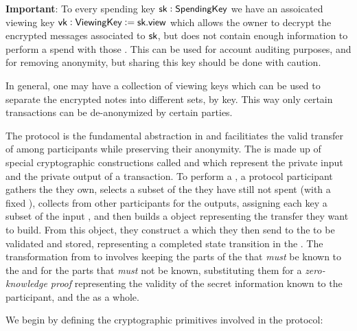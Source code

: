 \textbf{Important}: To every spending key ${\textsf{sk}} : {\textsf{SpendingKey}}$ we have an assoicated viewing key ${\textsf{vk}} : {\textsf{ViewingKey}} := {\textsf{sk}}.{\textsf{view}}$ which allows the owner to decrypt the encrypted messages associated to ${\textsf{sk}}$, but does not contain enough information to perform a spend with those . This can be used for account auditing purposes, and for removing anonymity, but sharing this key should be done with caution.

In general, one may have a collection of viewing keys which can be used to separate the encrypted notes into different sets, by key. This way only certain transactions can be de-anonymized by certain parties.


The \Transfer{} protocol is the fundamental abstraction in \MantaPay{} and facilitiates the valid transfer of  among participants while preserving their anonymity. The \Transfer{} is made up of special cryptographic constructions called  and  which represent the private input and the private output of a transaction. To perform a \Transfer{}, a protocol participant gathers the  they own, selects a subset of the  they have still not spent (with a fixed \AssetId{}), collects  from other participants for the outputs, assigning each key a subset of the input , and then builds a \Transfer{} object representing the transfer they want to build. From this \Transfer{} object, they construct a \TransferPost{} which they then send to the \Ledger{} to be validated and stored, representing a completed state transition in the \Ledger{}. The transformation from \Transfer{} to \TransferPost{} involves keeping the parts of the \Transfer{} that \emph{must} be known to the \Ledger{} and for the parts that \emph{must} not be known, substituting them for a \emph{zero-knowledge proof} representing the validity of the secret information known to the participant, and the \Transfer{} as a whole.

We begin by defining the cryptographic primitives involved in the \Transfer{} protocol:

